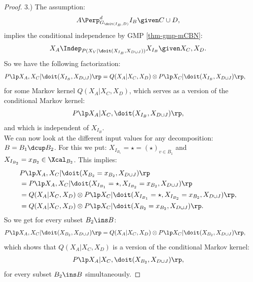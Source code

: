\begin{Prp}
\begin{proof}
3.) The assumption:
            \[ A \Perp^d_{G_{\doit(I_B,D)}} I_B \given C  \cup D,   \]
implies the conditional independence by GMP \ref{thm-gmp-mCBN}:
\[ X_A \Indep_{P(X_V|\doit(X_{I_B},X_{D\cup J}))} X_{I_B} \given X_C,X_D.\]
So we have the following factorization:
\begin{align} 
    P\lp X_A,X_C|\doit(X_{I_B},X_{D\cup J})\rp &= Q(X_A|X_C,X_D) \otimes P\lp X_C|\doit(X_{I_B},X_{D\cup J})\rp,
\label{eq:3nd-do-int-1} 
\end{align}
for some Markov kernel $Q(X_A|X_C,X_D)$, which serves as a version of the conditional Markov kernel:
\[P\lp X_A|X_C,\doit(X_{I_B},X_{D\cup J})\rp,\]
and which is independent of $X_{I_B}$.\\ 
We can now look at the different input values for any decomposition: $B=B_1 \dcup B_2$.
For this we put: $X_{I_{B_1}}= \star = (\star)_{v \in B_1}$ and  $ X_{I_{B_2}}=x_{B_2} \in \Xcal_{B_2}$.
This implies:
\begin{align*} 
  & P\lp X_A,X_C|\doit(X_{{B_2}}=x_{B_2},X_{D\cup J})\rp \\
  &= P\lp X_A,X_C|\doit(X_{I_{B_1}}=\star,X_{I_{B_2}}=x_{B_2},X_{D\cup J})\rp \\
  &= Q(X_A|X_C,X_D) \otimes P\lp X_C|\doit(X_{I_{B_1}}=\star,X_{I_{B_2}}=x_{B_2},X_{D\cup J})\rp,\\
  &= Q(X_A|X_C,X_D) \otimes P\lp X_C|\doit(X_{{B_2}}=x_{B_2},X_{D\cup J})\rp.
\end{align*}
So we get for every subset $B_2 \ins B$:
\begin{align} 
    P\lp X_A,X_C|\doit(X_{B_2},X_{D\cup J})\rp &= Q(X_A|X_C,X_D) \otimes P\lp X_C|\doit(X_{B_2},X_{D\cup J})\rp, \label{eq:3nd-do-int-2} 
\end{align}
which shows that $Q(X_A|X_C,X_D)$ is a version of the conditional Markov kernel:
\begin{align} P\lp X_A|X_C,\doit(X_{B_2},X_{D\cup J})\rp, \label{eq:3nd-do-int-3}  \end{align}
for every subset $B_2 \ins B$ simultaneously.


\end{proof}
\end{Prp}
